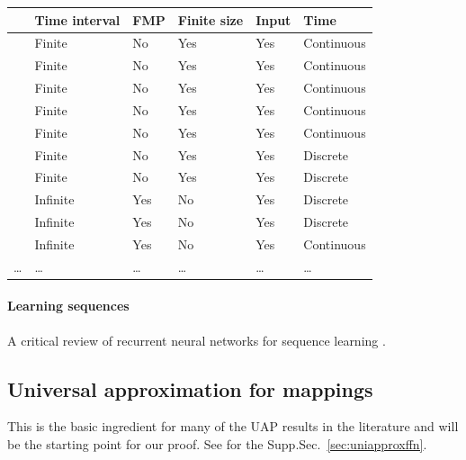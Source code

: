 \documentclass{article}
\theoremstyle{definition}
\theoremstyle{remark}
\newcounter{ct}
\begin{document}
\begin{table}[h]
\begin{tabular}{|l|l|l|l|l|l|}
\cline{2-6}
    \multicolumn{1}{c|}{}							%
 						&  Time interval & FMP	& Finite size 		&  Input     	&     Time   \\\cline{2-6}\hline
\citet{cybenko1989approximation} 	& Finite	& No 	& Yes 			&  Yes		&	Continuous\\\hline  %
\citet{funahashi1989approximate} 	& Finite	& No		& Yes			&  Yes		&	Continuous\\\hline  %
\citet{hornik1989multilayer} 		& Finite	& No 	& Yes			& Yes		&	Continuous\\\hline  %
\citet{funahashi1993approximation} 	& Finite	& No		& Yes			&  Yes		&	Continuous\\\hline
\citet{jin1995approximation}		& Finite	& No		& Yes			& Yes		&	Continuous	\\\hline
\citet{hammer2000approximation}	& Finite     & No 	& Yes			& Yes		& 	Discrete	\\\hline
\citet{jin1995universal}			& Finite	& No		& Yes			& Yes		&	Discrete	\\\hline
\citet{bai2019deq} 				& Infinite	& Yes	& No		 	& Yes 			&	Discrete		\\\hline
\citet{schafer2007uap} 			& Infinite 	& Yes	& No			& Yes 			&	Discrete\\\hline
\citet{wang2024state}			& Infinite   & Yes 	& No 		& Yes			& 	Continuous\\\hline %
\dots&\dots &\dots&\dots&\dots&\dots\\
\end{tabular}
\end{table}


\paragraph{Learning sequences}
 A critical review of recurrent neural networks for sequence learning \citep{williams1989learning, pearlmutter1989learning, lipton2015rnn}.
 

\subsection{Universal approximation for mappings}\label{sec:uapmappings}
This is the basic ingredient for many of the UAP results in the literature and will be the starting point for our proof.
See for the  Supp.Sec.~\ref{sec:uniapproxffn}.
\end{document}
